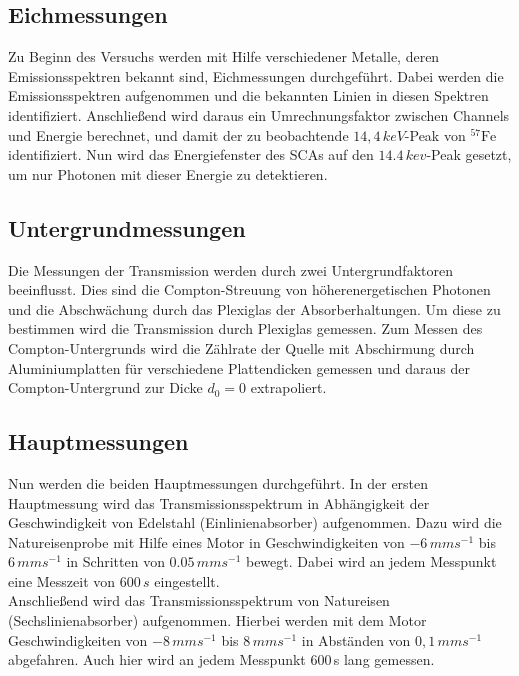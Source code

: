 	\subsection{Eichmessungen}
	
	Zu Beginn des Versuchs werden mit Hilfe verschiedener Metalle, deren Emissionsspektren bekannt sind, Eichmessungen durchgeführt. Dabei werden die Emissionsspektren aufgenommen und die bekannten Linien in diesen Spektren identifiziert. Anschließend wird daraus ein Umrechnungsfaktor zwischen Channels und Energie berechnet, und damit der zu beobachtende $14,4\,\si{keV}$-Peak von $^{57}\mathrm{Fe}$ identifiziert. Nun wird das Energiefenster des SCAs auf den $14.4\,\si{kev}$-Peak gesetzt, um nur Photonen mit dieser Energie zu detektieren.
	
	\subsection{Untergrundmessungen}
	
	Die Messungen der Transmission werden durch zwei Untergrundfaktoren beeinflusst. Dies sind die Compton-Streuung von höherenergetischen Photonen und die Abschwächung durch das Plexiglas der Absorberhaltungen. Um diese zu bestimmen wird die Transmission durch Plexiglas gemessen. Zum Messen des Compton-Untergrunds wird die Zählrate der Quelle mit Abschirmung durch Aluminiumplatten für verschiedene Plattendicken gemessen und daraus der Compton-Untergrund zur Dicke $d_0=0$ extrapoliert.
	
	\subsection{Hauptmessungen}
	
	Nun werden die beiden Hauptmessungen durchgeführt. In der ersten Hauptmessung wird das Transmissionsspektrum in Abhängigkeit der Geschwindigkeit von Edelstahl (Einlinienabsorber) aufgenommen. Dazu wird die Natureisenprobe mit Hilfe eines Motor in Geschwindigkeiten von $-6\,\si{mms^{-1}}$ bis $6\,\si{mms^{-1}}$ in Schritten von $0.05\,\si{mms^{-1}}$ bewegt. Dabei wird an jedem Messpunkt eine Messzeit von $600\,\si{s}$ eingestellt.\\
	
	Anschließend wird das Transmissionsspektrum von Natureisen (Sechslinienabsorber) aufgenommen. Hierbei werden mit dem Motor Geschwindigkeiten von $-8\,\si{mms^{-1}}$ bis $8\,\si{mms^{-1}}$ in Abständen von $0,1\,\si{mms^{-1}}$ abgefahren. Auch hier wird an jedem Messpunkt 600\,\si{s} lang gemessen.
	

